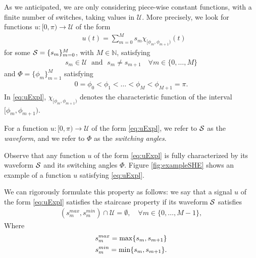 \documentclass[twocolumn]{autart}    %
\begin{document}
As we anticipated,  we are only considering piece-wise constant functions, with a finite number of switches, taking values in $\mathcal{U}$.
More precisely, we look for functions $u: [0,\pi)\to \mathcal{U}$ of the form
\begin{align}\label{eq:uExpl}
	&u (t)= \sum_{m=0}^M s_m\chi_{[\phi_m,\phi_{m+1})} (t)
\end{align}
for some $\mathcal{S} = \{ s_m\}_{m=0}^M$,  with $M\in \mathbb{N}$, satisfying
\begin{align*}
	s_m\in \mathcal{U} \; \text{ and } \; s_m\neq s_{m+1} \quad \forall m\in \{0,\ldots, M\}
\end{align*}
and $\Phi = \{ \phi_m\}_{m=1}^{M}$ satisfying
\begin{align*}
	0= \phi_0 < \phi_1 <\ldots < \phi_M < \phi_{M+1} = \pi .
\end{align*}
In \eqref{eq:uExpl}, $\chi_{[\phi_m,\phi_{m+1})}$ denotes the characteristic function of the interval $[\phi_m,\phi_{m+1})$.

\medskip

\begin{definition}\label{def: waveform and switching angles}
For a function $u: [0,\pi) \to \mathcal{U}$ of the form \eqref{eq:uExpl}, we refer to $\mathcal{S}$ as the \emph{waveform}, and we refer to $\Phi$ as the \emph{switching angles}.
\end{definition}

Observe that any function $u$ of the form \eqref{eq:uExpl} is fully characterized by its waveform $\mathcal{S}$ and its switching angles $\Phi$.
Figure \ref{fig:exampleSHE} shows an example of a function $u$ satisfying \eqref{eq:uExpl}. 

We can rigorously formulate this property as follows: we say that a signal $u$ of the form \eqref{eq:uExpl} satisfies the staircase property if its waveform $\mathcal{S}$ satisfies
\JOStart
\begin{gather}\label{eq:staircase prop}
	(s_m^{max},s_{m}^{min}) \cap \mathcal{U} = \emptyset, \quad \forall m\in \{ 0, \ldots, M-1 \},
\end{gather}
Where 
\begin{gather}
	\notag s^{max}_m = \max\{s_m,s_{m+1}\} \\
	\notag s^{min}_m = \min\{s_m,s_{m+1}\}.
\end{gather}
\JOEnd
\end{document}

